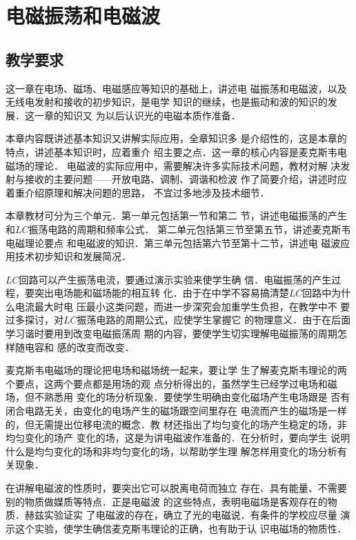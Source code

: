 \chapter{电磁振荡和电磁波}\minitoc[n]
\section{教学要求}

这一章在电场、磁场、电磁感应等知识的基础上，讲述电
磁振荡和电磁波，以及无线电发射和接收的初步知识，是电学
知识的继续，也是振动和波的知识的发展．这一章的知识又
为以后认识光的电磁本质作准备．

本章内容既讲述基本知识又讲解实际应用，全章知识多
是介绍性的，这是本章的特点，讲述基本知识时，应着重介
绍主要之点．这一章的核心内容是麦克斯韦电磁场的理论．
电磁波的实际应用中，需要解决许多实际技术问题，教材对解
决发射与接收的主要问题——开放电路、调制、调谐和检波
作了简要介绍，讲述时应着重介绍原理和解决问题的思路，
不宜过多地涉及技术细节．

本章教材可分为三个单元．第一单元包括第一节和第二
节，讲述电磁振荡的产生和$LC$振荡电路的周期和频率公式．
第二单元包括第三节至第五节，讲述麦克斯韦电磁理论要点
和电磁波的知识．第三单元包括第六节至第十二节，讲述电
磁波应用技术初步知识和发展简况．

$LC$回路可以产生振荡电流，要通过演示实验来使学生确
信．电磁振荡的产生过程，要突出电场能和磁场能的相互转
化．由于在中学不容易搞清楚$LC$回路中为什么电流最大时电
压最小这类问题，而进一步深究会加重学生负担，在教学中不
要过多探讨，对$LC$振荡电路的周期公式，应使学生掌握它
的物理意义．由于在后面学习谐时要用到改变电磁振荡周
期的内容，要使学生切实理解电磁振荡的周期怎样随电容和
感的改变而改变．

麦克斯韦电磁场的理论把电场和磁场统一起来，要让学
生了解麦克斯韦理论的两个要点，这两个要点都是用场的观
点分析得出的，虽然学生已经学过电场和磁场，但不熟悉用
变化的场分析现象．要使学生明确由变化磁场产生电场跟是
否有闭合电路无关，由变化的电场产生的磁场跟空间里存在
电流而产生的磁场是一样的，但无需提出位移电流的概念．教
材还指出了均匀变化的场产生稳定的场，非均匀变化的场产
变化的场，这是为讲电磁波作准备的．在分析时，要向学生
说明什么是均匀变化的场和非均匀变化的场，以帮助学生理
解怎样用变化的场分析有关现象．

在讲解电磁波的性质时，要突出它可以脱离电荷而独立
存在、具有能量、不需要别的物质做媒质等特点．正是电磁波
的这些特点，表明电磁场是客观存在的物质．赫兹实验证实
了电磁波的存在，确立了光的电磁说．有条件的学校应尽量
演示这个实验，使学生确信麦克斯韦理论的正确，也有助于认
识电磁场的物质性．

